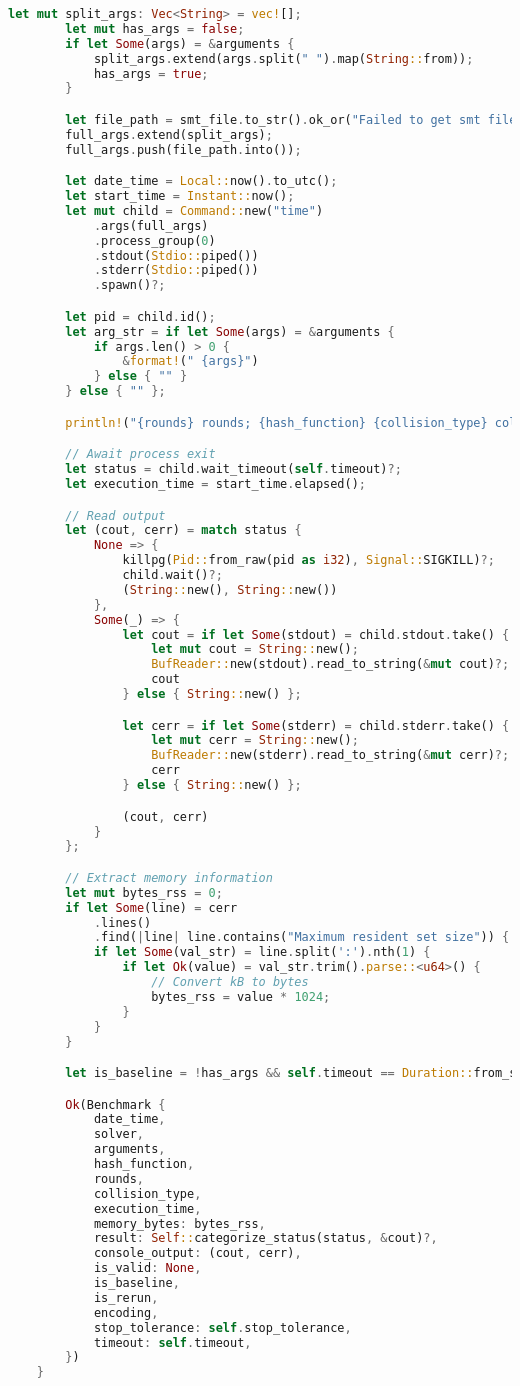 \begin{lstlisting}[language=rust, caption={benchmark/runner.rs}]
		let mut split_args: Vec<String> = vec![];
		let mut has_args = false;
		if let Some(args) = &arguments {
			split_args.extend(args.split(" ").map(String::from));
			has_args = true;
		}

		let file_path = smt_file.to_str().ok_or("Failed to get smt file path")?;
		full_args.extend(split_args);
		full_args.push(file_path.into());

		let date_time = Local::now().to_utc();
		let start_time = Instant::now();
		let mut child = Command::new("time")
			.args(full_args)
			.process_group(0)
			.stdout(Stdio::piped())
			.stderr(Stdio::piped())
			.spawn()?;

		let pid = child.id();
		let arg_str = if let Some(args) = &arguments {
			if args.len() > 0 {
				&format!(" {args}")
			} else { "" }
		} else { "" };

		println!("{rounds} rounds; {hash_function} {collision_type} collision; {solver}{arg_str}; SMT solver PID: {pid}\nFile: {file_path}");

		// Await process exit
		let status = child.wait_timeout(self.timeout)?;
		let execution_time = start_time.elapsed();

		// Read output
		let (cout, cerr) = match status {
			None => {
				killpg(Pid::from_raw(pid as i32), Signal::SIGKILL)?;
				child.wait()?;
				(String::new(), String::new())
			},
			Some(_) => {
				let cout = if let Some(stdout) = child.stdout.take() {
					let mut cout = String::new();
					BufReader::new(stdout).read_to_string(&mut cout)?;
					cout
				} else { String::new() };

				let cerr = if let Some(stderr) = child.stderr.take() {
					let mut cerr = String::new();
					BufReader::new(stderr).read_to_string(&mut cerr)?;
					cerr
				} else { String::new() };

				(cout, cerr)
			}
		};

		// Extract memory information
		let mut bytes_rss = 0;
		if let Some(line) = cerr
			.lines()
			.find(|line| line.contains("Maximum resident set size")) {
			if let Some(val_str) = line.split(':').nth(1) {
				if let Ok(value) = val_str.trim().parse::<u64>() {
					// Convert kB to bytes
					bytes_rss = value * 1024;
				}
			}
		}

		let is_baseline = !has_args && self.timeout == Duration::from_secs(900);

		Ok(Benchmark {
			date_time,
			solver,
			arguments,
			hash_function,
			rounds,
			collision_type,
			execution_time,
			memory_bytes: bytes_rss,
			result: Self::categorize_status(status, &cout)?,
			console_output: (cout, cerr),
			is_valid: None,
			is_baseline,
			is_rerun,
			encoding,
			stop_tolerance: self.stop_tolerance,
			timeout: self.timeout,
		})
	}


\end{lstlisting}
